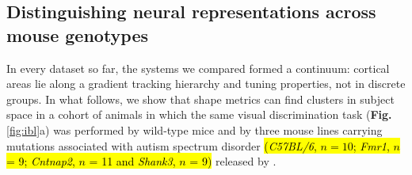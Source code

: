 
\subsection{Distinguishing neural representations across mouse genotypes}

In every dataset so far, the systems we compared formed a continuum: cortical areas lie along a gradient tracking hierarchy and tuning properties, not in discrete groups. In what follows, we show that shape metrics can find clusters in subject space in a cohort of animals in which the same visual discrimination task (\textbf{Fig.} \ref{fig:ibl}a) was performed by
wild-type mice and by three mouse lines carrying mutations associated with autism
spectrum disorder \hl{(\textit{C57BL/6}, $n=10$; \textit{Fmr1}, $n$ = 9; \textit{Cntnap2}, $n$ = 11 and \textit{Shank3}, $n$ = 9)} released by \cite{noel2025}.


